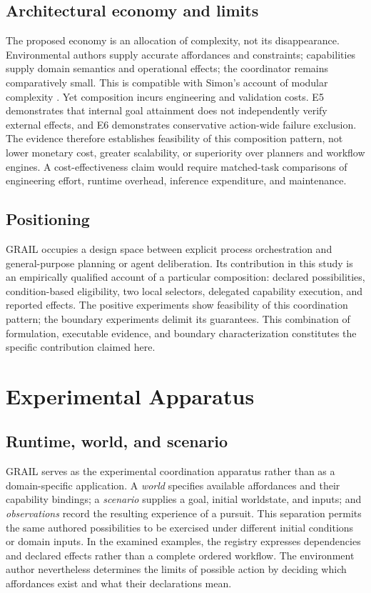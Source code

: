 \documentclass[11pt]{article}
\begin{document}
\subsection{Architectural economy and limits}
The proposed economy is an allocation of complexity, not its disappearance. Environmental authors supply accurate affordances and constraints; capabilities supply domain semantics and operational effects; the coordinator remains comparatively small. This is compatible with Simon's account of modular complexity \cite{Simon1962}. Yet composition incurs engineering and validation costs. E5 demonstrates that internal goal attainment does not independently verify external effects, and E6 demonstrates conservative action-wide failure exclusion. The evidence therefore establishes feasibility of this composition pattern, not lower monetary cost, greater scalability, or superiority over planners and workflow engines. A cost-effectiveness claim would require matched-task comparisons of engineering effort, runtime overhead, inference expenditure, and maintenance.
\subsection{Positioning}
GRAIL occupies a design space between explicit process orchestration and general-purpose planning or agent deliberation. Its contribution in this study is an empirically qualified account of a particular composition: declared possibilities, condition-based eligibility, two local selectors, delegated capability execution, and reported effects. The positive experiments show feasibility of this coordination pattern; the boundary experiments delimit its guarantees. This combination of formulation, executable evidence, and boundary characterization constitutes the specific contribution claimed here.

\section{Experimental Apparatus}
\subsection{Runtime, world, and scenario}
GRAIL serves as the experimental coordination apparatus rather than as a domain-specific application. A \emph{world} specifies available affordances and their capability bindings; a \emph{scenario} supplies a goal, initial worldstate, and inputs; and \emph{observations} record the resulting experience of a pursuit. This separation permits the same authored possibilities to be exercised under different initial conditions or domain inputs. In the examined examples, the registry expresses dependencies and declared effects rather than a complete ordered workflow. The environment author nevertheless determines the limits of possible action by deciding which affordances exist and what their declarations mean.
\end{document}

